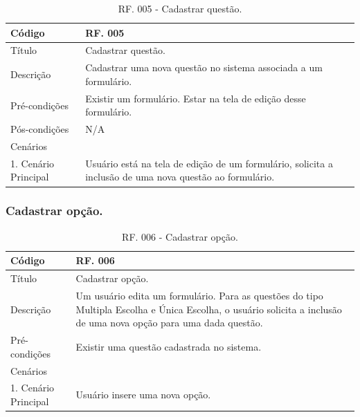 \documentclass[11pt]{article}
\begin{document}
        \begin{table}[h]
          \begin{center}
            \begin{tabular}{ | p{5cm} | p{10cm} | }
              \hline
              Código\cellcolor{gray} & RF. 005\cellcolor{gray} \\
              \hline
              Título & Cadastrar questão. \\
              \hline
              Descrição & Cadastrar uma nova questão no sistema associada a um formulário. \\
              \hline
              Pré-condições & Existir um formulário. Estar na tela de edição desse formulário. \\
              \hline
              Pós-condições & N/A \\
              \hline
              Cenários &   \\
              \hline
              1.  Cenário Principal & Usuário está na tela de edição de um formulário, solicita a inclusão de uma nova questão ao formulário. \\
              \hline
            \end{tabular}
            \caption{RF. 005 - Cadastrar questão.}
          \end{center}
        \end{table}

    \clearpage

      \subsubsection{Cadastrar opção.}

        \begin{table}[h]
          \begin{center}
            \begin{tabular}{ | p{5cm} | p{10cm} | }
              \hline
              Código\cellcolor{gray} & RF. 006\cellcolor{gray} \\
              \hline
              Título & Cadastrar opção. \\
              \hline
              Descrição & Um usuário edita um formulário. Para as questões do tipo Multipla Escolha e Única Escolha, o usuário solicita a inclusão de uma nova opção para uma dada questão. \\
              \hline
              Pré-condições & Existir uma questão cadastrada no sistema. \\
              \hline
              Cenários &   \\
              \hline
              1.  Cenário Principal & Usuário insere uma nova opção. \\
              \hline
            \end{tabular}
            \caption{RF. 006 - Cadastrar opção.}
          \end{center}
        \end{table}
\end{document}
